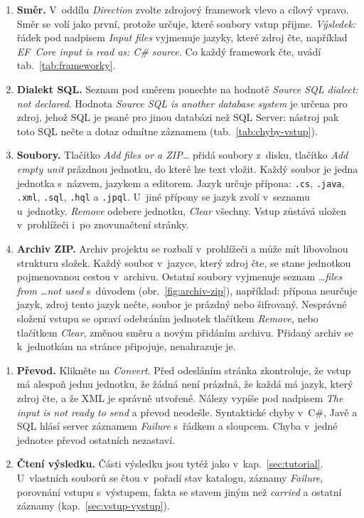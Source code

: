 \begin{enumerate}[leftmargin=*,itemsep=2pt]
\item \textbf{Směr.} V~oddílu \emph{Direction} zvolte zdrojový framework vlevo a cílový vpravo. Směr se volí jako první, protože určuje, které soubory vstup přijme. \emph{Výsledek:} řádek pod nadpisem \emph{Input files} vyjmenuje jazyky, které zdroj čte, například \emph{EF~Core input is read as: C\# source.} Co každý framework čte, uvádí tab.~\ref{tab:frameworky}.
\item \textbf{Dialekt SQL.} Seznam pod směrem ponechte na hodnotě \emph{Source SQL dialect: not declared}. Hodnota \emph{Source SQL is another database system} je určena pro zdroj, jehož SQL je psané pro jinou databázi než SQL Server: nástroj pak toto SQL nečte a dotaz odmítne záznamem (tab.~\ref{tab:chyby-vstup}).
\item \textbf{Soubory.} Tlačítko \emph{Add files or a ZIP\ldots} přidá soubory z~disku, tlačítko \emph{Add empty unit} prázdnou jednotku, do které lze text vložit. Každý soubor je jedna jednotka s~názvem, jazykem a editorem. Jazyk určuje přípona: \texttt{.cs}, \texttt{.java}, \texttt{.xml}, \texttt{.sql}, \texttt{.hql} a \texttt{.jpql}. U~jiné přípony se jazyk zvolí v~seznamu u~jednotky. \emph{Remove} odebere jednotku, \emph{Clear} všechny. Vstup zůstává uložen v~prohlížeči i~po znovunačtení stránky.
\item \textbf{Archiv ZIP.} Archiv projektu se rozbalí v~prohlížeči a může mít libovolnou strukturu složek. Každý soubor v~jazyce, který zdroj čte, se stane jednotkou pojmenovanou cestou v~archivu. Ostatní soubory vyjmenuje seznam \emph{\ldots files from \ldots not used} s~důvodem (obr.~\ref{fig:archiv-zip}), například: přípona neurčuje jazyk, zdroj tento jazyk nečte, soubor je prázdný nebo šifrovaný. Nesprávné složení vstupu se opraví odebráním jednotek tlačítkem \emph{Remove}, nebo tlačítkem \emph{Clear}, změnou směru a novým přidáním archivu. Přidaný archiv se k~jednotkám na stránce připojuje, nenahrazuje je.
\end{enumerate}


\begin{enumerate}[resume,leftmargin=*,itemsep=2pt]
\item \textbf{Převod.} Klikněte na \emph{Convert}. Před odesláním stránka zkontroluje, že vstup má alespoň jednu jednotku, že žádná není prázdná, že každá má jazyk, který zdroj čte, a že XML je správně utvořené. Nálezy vypíše pod nadpisem \emph{The input is not ready to send} a převod neodešle. Syntaktické chyby v~C\#, Javě a SQL hlásí server záznamem \emph{Failure} s~řádkem a sloupcem. Chyba v~jedné jednotce převod ostatních nezastaví.
\item \textbf{Čtení výsledku.} Části výsledku jsou tytéž jako v~kap.~\ref{sec:tutorial}. U~vlastních souborů se čtou v~pořadí stav katalogu, záznamy \emph{Failure}, porovnání vstupu s~výstupem, fakta se stavem jiným než \emph{carried} a ostatní záznamy (kap.~\ref{sec:vstup-vystup}).
\end{enumerate}

